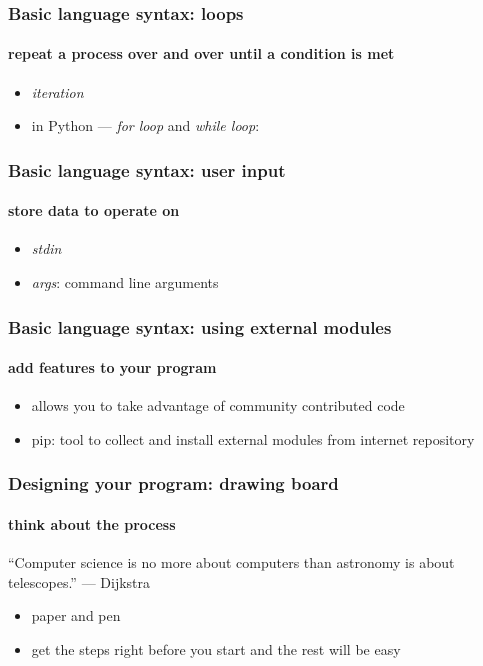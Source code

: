 \documentclass{beamer}
\begin{document}


    \begin{frame}
	    \frametitle{Basic language syntax: loops}
	    \framesubtitle{repeat a process over and over until a condition is met}
	    \begin{itemize}
		    \item \textit{iteration}
		    \item in Python --- \textit{for loop} and \textit{while loop}:
	    \end{itemize}
	    \lstJ
    \end{frame}

    \begin{frame}
	    \frametitle{Basic language syntax: user input}
	    \framesubtitle{store data to operate on}
	    \begin{itemize}
		    \item \textit{stdin}
		    \item \textit{args}: command line arguments
	    \end{itemize}
    \end{frame}


    \begin{frame}
	    \frametitle{Basic language syntax: using external modules}
	    \framesubtitle{add features to your program}
	    \begin{itemize}
		    \item allows you to take advantage of community contributed code
		    \item pip: tool to collect and install external modules from internet repository
	    \end{itemize}
    \end{frame}

    \begin{frame}
	    \frametitle{Designing your program: drawing board}
	    \framesubtitle{think about the process}
		    ``Computer science is no more about computers than astronomy is about telescopes.'' --- Dijkstra
	    \begin{itemize}
		    \item paper and pen
		    \item get the steps right before you start and the rest will be easy
	    \end{itemize}
    \end{frame}
\end{document}
